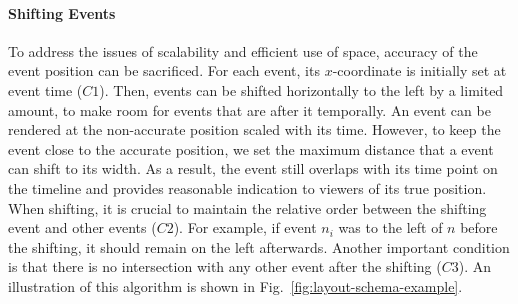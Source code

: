 \paragraph*{Shifting Events}
To address the issues of scalability and efficient use of space, accuracy of the event position can be sacrificed. For each event, its $x$-coordinate is initially set at event time ($C1$). Then, events can be shifted horizontally to the left by a limited amount, to make room for events that are after it temporally. An event can be rendered at the non-accurate position scaled with its time. However, to keep the event close to the accurate position, we set the maximum distance that a event can shift to its width. As a result, the event still overlaps with its time point on the timeline and provides reasonable indication to viewers of its true position. When shifting, it is crucial to maintain the relative order between the shifting event and other events ($C2$). For example, if event $n_i$ was to the left of $n$ before the shifting, it should remain on the left afterwards. Another important condition is that there is no intersection with any other event after the shifting ($C3$). An illustration of this algorithm is shown in Fig.~\ref{fig:layout-schema-example}.



